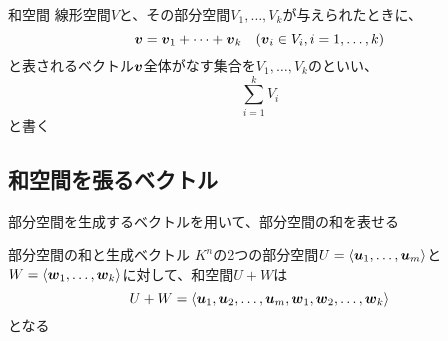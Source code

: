 \documentclass[../../../topic_linear-algebra]{subfiles}
\begin{document}
\begin{definition}{和空間}
  線形空間$V$と、その部分空間$V_1,\ldots,V_k$が与えられたときに、
  \begin{equation*}
    \vb*{v} = \vb*{v}_1 + \cdots + \vb*{v}_k \quad (\vb*{v}_i \in V_i, i = 1, \ldots, k)
  \end{equation*}
  と表されるベクトル$\vb*{v}$全体がなす集合を$V_1,\ldots,V_k$のといい、
  \begin{equation*}
    \sum_{i=1}^k V_i
  \end{equation*}
  と書く
\end{definition}

\subsection{和空間を張るベクトル}

部分空間を生成するベクトルを用いて、部分空間の和を表せる

\begin{theorem}{部分空間の和と生成ベクトル}\label{thm:sum-of-subspaces-span}
  $K^n$の2つの部分空間$U = \langle \vb*{u}_1, \dots, \vb*{u}_m \rangle$と
  $W = \langle \vb*{w}_1, \dots, \vb*{w}_k \rangle$に対して、和空間$U + W$は
  \begin{equation*}
    U + W = \langle \vb*{u}_1, \vb*{u}_2, \dots, \vb*{u}_m, \vb*{w}_1, \vb*{w}_2, \dots, \vb*{w}_k \rangle
  \end{equation*}
  となる
\end{theorem}
\end{document}
